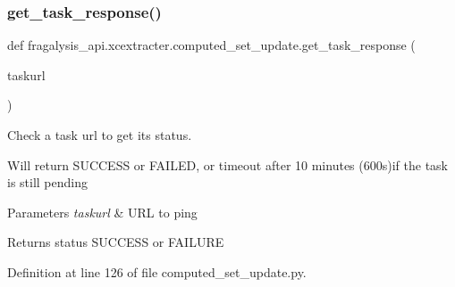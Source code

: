 \subsubsection{\texorpdfstring{get\+\_\+task\+\_\+response()}{get\_task\_response()}}
{\footnotesize\ttfamily def fragalysis\+\_\+api.\+xcextracter.\+computed\+\_\+set\+\_\+update.\+get\+\_\+task\+\_\+response (\begin{DoxyParamCaption}\item[{}]{taskurl }\end{DoxyParamCaption})}



Check a task url to get it\textquotesingle{}s status. 

Will return S\+U\+C\+C\+E\+SS or F\+A\+I\+L\+ED, or timeout after 10 minutes (600s)if the task is still pending


\begin{DoxyParams}{Parameters}
{\em taskurl} & U\+RL to ping\\
\hline
\end{DoxyParams}
\begin{DoxyReturn}{Returns}
status S\+U\+C\+C\+E\+SS or F\+A\+I\+L\+U\+RE 
\end{DoxyReturn}


Definition at line 126 of file computed\+\_\+set\+\_\+update.\+py.


